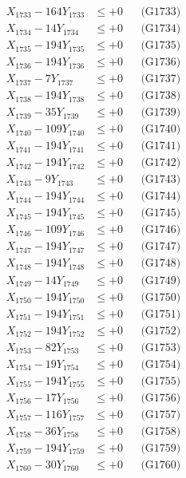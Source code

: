 \documentclass[a4paper,10pt]{article}
\begin{document}
{\begin{align}
X_{1733} - 164Y_{1733} &\leq +0 && \text{(G1733)} \\
X_{1734} - 14Y_{1734} &\leq +0 && \text{(G1734)} \\
X_{1735} - 194Y_{1735} &\leq +0 && \text{(G1735)} \\
X_{1736} - 194Y_{1736} &\leq +0 && \text{(G1736)} \\
X_{1737} - 7Y_{1737} &\leq +0 && \text{(G1737)} \\
X_{1738} - 194Y_{1738} &\leq +0 && \text{(G1738)} \\
X_{1739} - 35Y_{1739} &\leq +0 && \text{(G1739)} \\
X_{1740} - 109Y_{1740} &\leq +0 && \text{(G1740)} \\
\allowbreak
X_{1741} - 194Y_{1741} &\leq +0 && \text{(G1741)} \\
X_{1742} - 194Y_{1742} &\leq +0 && \text{(G1742)} \\
X_{1743} - 9Y_{1743} &\leq +0 && \text{(G1743)} \\
X_{1744} - 194Y_{1744} &\leq +0 && \text{(G1744)} \\
X_{1745} - 194Y_{1745} &\leq +0 && \text{(G1745)} \\
X_{1746} - 109Y_{1746} &\leq +0 && \text{(G1746)} \\
X_{1747} - 194Y_{1747} &\leq +0 && \text{(G1747)} \\
X_{1748} - 194Y_{1748} &\leq +0 && \text{(G1748)} \\
X_{1749} - 14Y_{1749} &\leq +0 && \text{(G1749)} \\
X_{1750} - 194Y_{1750} &\leq +0 && \text{(G1750)} \\
\allowbreak
X_{1751} - 194Y_{1751} &\leq +0 && \text{(G1751)} \\
X_{1752} - 194Y_{1752} &\leq +0 && \text{(G1752)} \\
X_{1753} - 82Y_{1753} &\leq +0 && \text{(G1753)} \\
X_{1754} - 19Y_{1754} &\leq +0 && \text{(G1754)} \\
X_{1755} - 194Y_{1755} &\leq +0 && \text{(G1755)} \\
X_{1756} - 17Y_{1756} &\leq +0 && \text{(G1756)} \\
X_{1757} - 116Y_{1757} &\leq +0 && \text{(G1757)} \\
X_{1758} - 36Y_{1758} &\leq +0 && \text{(G1758)} \\
X_{1759} - 194Y_{1759} &\leq +0 && \text{(G1759)} \\
X_{1760} - 30Y_{1760} &\leq +0 && \text{(G1760)} \\

\end{align}}
\end{document}
